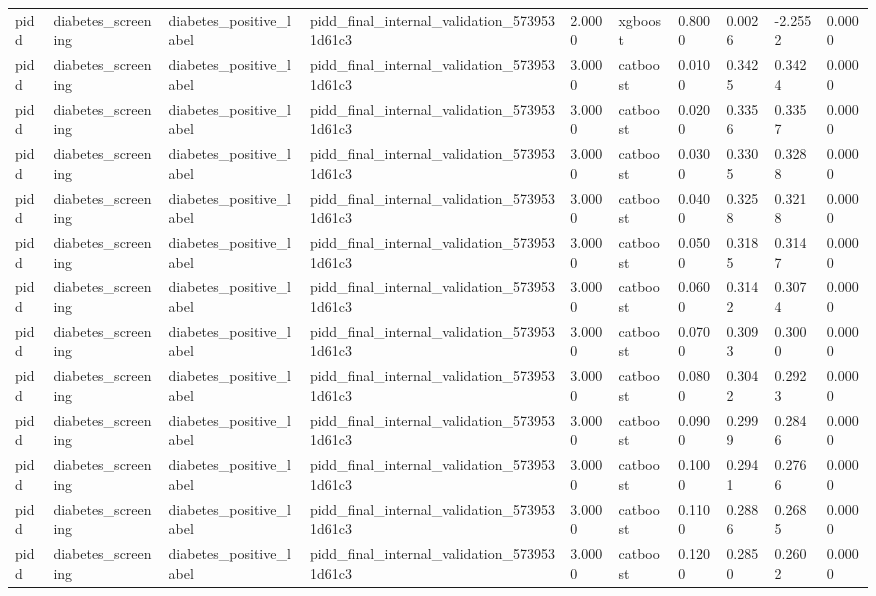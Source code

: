 \begin{tabular}{llllllllll}
pidd & diabetes\_screening & diabetes\_positive\_label & pidd\_final\_internal\_validation\_5739531d61c3 & 2.0000 & xgboost & 0.8000 & 0.0026 & -2.2552 & 0.0000 \\
pidd & diabetes\_screening & diabetes\_positive\_label & pidd\_final\_internal\_validation\_5739531d61c3 & 3.0000 & catboost & 0.0100 & 0.3425 & 0.3424 & 0.0000 \\
pidd & diabetes\_screening & diabetes\_positive\_label & pidd\_final\_internal\_validation\_5739531d61c3 & 3.0000 & catboost & 0.0200 & 0.3356 & 0.3357 & 0.0000 \\
pidd & diabetes\_screening & diabetes\_positive\_label & pidd\_final\_internal\_validation\_5739531d61c3 & 3.0000 & catboost & 0.0300 & 0.3305 & 0.3288 & 0.0000 \\
pidd & diabetes\_screening & diabetes\_positive\_label & pidd\_final\_internal\_validation\_5739531d61c3 & 3.0000 & catboost & 0.0400 & 0.3258 & 0.3218 & 0.0000 \\
pidd & diabetes\_screening & diabetes\_positive\_label & pidd\_final\_internal\_validation\_5739531d61c3 & 3.0000 & catboost & 0.0500 & 0.3185 & 0.3147 & 0.0000 \\
pidd & diabetes\_screening & diabetes\_positive\_label & pidd\_final\_internal\_validation\_5739531d61c3 & 3.0000 & catboost & 0.0600 & 0.3142 & 0.3074 & 0.0000 \\
pidd & diabetes\_screening & diabetes\_positive\_label & pidd\_final\_internal\_validation\_5739531d61c3 & 3.0000 & catboost & 0.0700 & 0.3093 & 0.3000 & 0.0000 \\
pidd & diabetes\_screening & diabetes\_positive\_label & pidd\_final\_internal\_validation\_5739531d61c3 & 3.0000 & catboost & 0.0800 & 0.3042 & 0.2923 & 0.0000 \\
pidd & diabetes\_screening & diabetes\_positive\_label & pidd\_final\_internal\_validation\_5739531d61c3 & 3.0000 & catboost & 0.0900 & 0.2999 & 0.2846 & 0.0000 \\
pidd & diabetes\_screening & diabetes\_positive\_label & pidd\_final\_internal\_validation\_5739531d61c3 & 3.0000 & catboost & 0.1000 & 0.2941 & 0.2766 & 0.0000 \\
pidd & diabetes\_screening & diabetes\_positive\_label & pidd\_final\_internal\_validation\_5739531d61c3 & 3.0000 & catboost & 0.1100 & 0.2886 & 0.2685 & 0.0000 \\
pidd & diabetes\_screening & diabetes\_positive\_label & pidd\_final\_internal\_validation\_5739531d61c3 & 3.0000 & catboost & 0.1200 & 0.2850 & 0.2602 & 0.0000 \\

\end{tabular}
